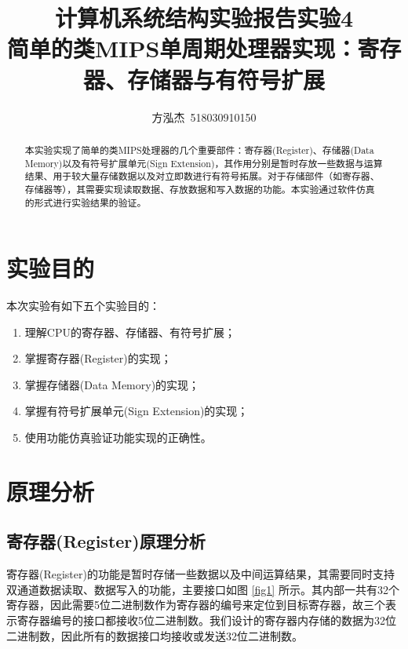 \documentclass{cumcm}
\title{\textbf{计算机系统结构实验报告\quad 实验4}\\{\Large 简单的类MIPS单周期处理器实现：寄存器、存储器与有符号扩展}}
\author{方泓杰\ 518030910150}
\numberwithin{equation}{section}
\numberwithin{equation}{subsection}
\begin{document}
\maketitle

\begin{abstract}
  本实验实现了简单的类MIPS处理器的几个重要部件：寄存器(Register)、存储器(Data Memory)以及有符号扩展单元(Sign Extension)，其作用分别是暂时存放一些数据与运算结果、用于较大量存储数据以及对立即数进行有符号拓展。对于存储部件（如寄存器、存储器等），其需要实现读取数据、存放数据和写入数据的功能。本实验通过软件仿真的形式进行实验结果的验证。
\end{abstract}

\maketitle \tableofcontents
\newpage

\section{实验目的}\label{section1}
本次实验有如下五个实验目的：
\begin{enumerate}
    \item 理解CPU的寄存器、存储器、有符号扩展；
    \item 掌握寄存器(Register)的实现；
    \item 掌握存储器(Data Memory)的实现；
    \item 掌握有符号扩展单元(Sign Extension)的实现；
    \item 使用功能仿真验证功能实现的正确性。
\end{enumerate}

\section{原理分析}\label{section2}

\subsection{寄存器(Register)原理分析}\label{section2.1}

寄存器(Register)的功能是暂时存储一些数据以及中间运算结果，其需要同时支持双通道数据读取、数据写入的功能，主要接口如图 \ref{fig1} 所示。其内部一共有32个寄存器，因此需要5位二进制数作为寄存器的编号来定位到目标寄存器，故三个表示寄存器编号的接口都接收5位二进制数。我们设计的寄存器内存储的数据为32位二进制数，因此所有的数据接口均接收或发送32位二进制数。
\end{document}
